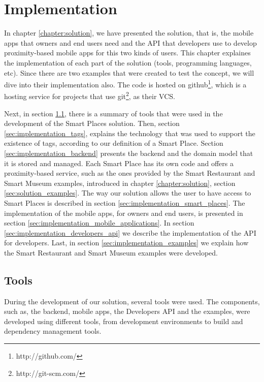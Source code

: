 
\chapter{Implementation}
\label{chapter:implementation}
In chapter \ref{chapter:solution}, we have presented the solution, that is,
the mobile apps that owners and end users need and the \gls{API} that developers use
to develop proximity-based mobile apps for this two kinds of users.
This chapter explaines the implementation of each part of the solution
(tools, programming languages, etc). Since there are two examples that were
created to test the concept, we will dive into their implementation also.
The code is hosted on
github\footnote{http://github.com/}, which is a hosting service for projects
that use git\footnote{http://git-scm.com/}, as their \gls{VCS}.

Next, in section \ref{sec:implementation_tools}, there is a summary of tools that were used in the development of the Smart Places solution.
Then, section \ref{sec:implementation_tags}, explains the technology that was used to support the existence of tags, according to our definition of a Smart Place.
Section \ref{sec:implementation_backend} presents the backend and the domain model that it is stored and managed.
Each Smart Place has its own code and offers a proximity-based service, such as the ones provided by the Smart Restaurant and Smart Museum examples, introduced in chapter \ref{chapter:solution}, section \ref{sec:solution_examples}.
The way our solution allows the user to have access to Smart Places is described in section \ref{sec:implementation_smart_places}.
The implementation of the mobile apps, for owners and end users, is presented in section \ref{sec:implementation_mobile_applications}.
In section \ref{sec:implementation_developers_api} we describe the implementation of the \gls{API} for developers.
Last, in section \ref{sec:implementation_examples} we explain how the Smart Restaurant and Smart Museum examples were developed.

\section{Tools}
\label{sec:implementation_tools}
During the development of our solution, several tools were used.
The components, such as, the backend, mobile apps, the Developers \gls{API} and the examples, were developed using different tools, from development environments to build and dependency management tools.

